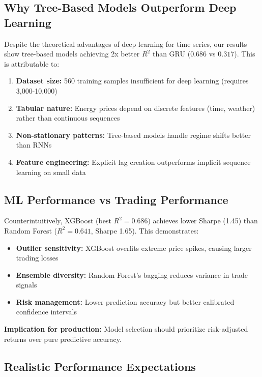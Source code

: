\documentclass[11pt,a4paper]{article}
\begin{document}
\subsection{Why Tree-Based Models Outperform Deep Learning}

Despite the theoretical advantages of deep learning for time series, our results show tree-based models achieving 2x better $R^2$ than GRU ($0.686$ vs $0.317$). This is attributable to:

\begin{enumerate}
    \item \textbf{Dataset size:} 560 training samples insufficient for deep learning (requires 3,000-10,000)
    \item \textbf{Tabular nature:} Energy prices depend on discrete features (time, weather) rather than continuous sequences
    \item \textbf{Non-stationary patterns:} Tree-based models handle regime shifts better than RNNs
    \item \textbf{Feature engineering:} Explicit lag creation outperforms implicit sequence learning on small data
\end{enumerate}

\subsection{ML Performance vs Trading Performance}

Counterintuitively, XGBoost (best $R^2 = 0.686$) achieves lower Sharpe (1.45) than Random Forest ($R^2 = 0.641$, Sharpe 1.65). This demonstrates:

\begin{itemize}
    \item \textbf{Outlier sensitivity:} XGBoost overfits extreme price spikes, causing larger trading losses
    \item \textbf{Ensemble diversity:} Random Forest's bagging reduces variance in trade signals
    \item \textbf{Risk management:} Lower prediction accuracy but better calibrated confidence intervals
\end{itemize}

\textbf{Implication for production:} Model selection should prioritize risk-adjusted returns over pure predictive accuracy.

\subsection{Realistic Performance Expectations}
\end{document}
